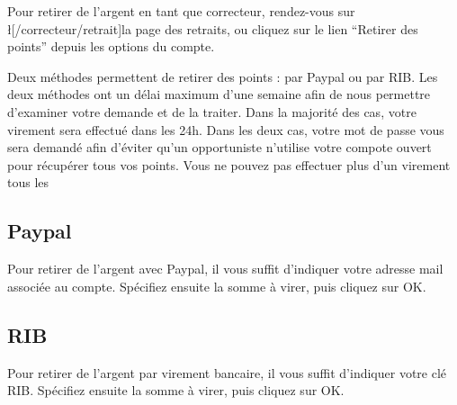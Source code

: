 ﻿Pour retirer de l’argent en tant que correcteur, rendez-vous sur \l[/correcteur/retrait]{la page des retraits}, ou cliquez sur le lien “Retirer des points” depuis les options du compte.

Deux méthodes permettent de retirer des points : par Paypal ou par RIB.
Les deux méthodes ont un délai maximum d’une semaine afin de nous permettre d’examiner votre demande et de la traiter. Dans la majorité des cas, votre virement sera effectué dans les 24h.
Dans les deux cas, votre mot de passe vous sera demandé afin d’éviter qu’un opportuniste n’utilise votre compote ouvert pour récupérer tous vos points.
Vous ne pouvez pas effectuer plus d’un virement tous les %

\subsection{Paypal}
Pour retirer de l’argent avec Paypal, il vous suffit d’indiquer votre adresse mail associée au compte.
Spécifiez ensuite la somme à virer, puis cliquez sur OK.

\subsection{RIB}
Pour retirer de l’argent par virement bancaire, il vous suffit d’indiquer votre clé RIB.
Spécifiez ensuite la somme à virer, puis cliquez sur OK.